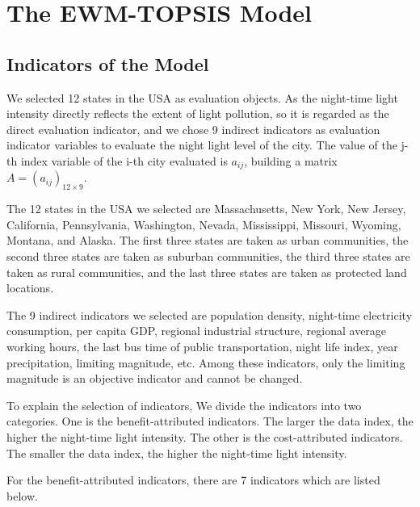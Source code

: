 \section{The EWM-TOPSIS Model}

\subsection{Indicators of the Model}
We selected 12 states in the USA as evaluation objects. As the night-time light intensity directly reflects the extent of light pollution, so it is regarded as the direct evaluation indicator, and we chose 9 indirect indicators as evaluation indicator variables to evaluate the night light level of the city. 
The value of the j-th index variable of the i-th city evaluated is $a_{ij}$, building a matrix $A=(a_{ij})_{12\times9}$.

The 12 states in the USA we selected are Massachusetts, New York, New Jersey, California, Pennsylvania, Washington, Nevada, Mississippi, Missouri, Wyoming, Montana, and Alaska. The first three states are taken as urban communities, the second three states are taken as suburban communities, the third three states are taken as rural communities, and the last three states are taken as protected land locations.

The 9 indirect indicators we selected are population density, night-time electricity consumption, per capita GDP, regional industrial structure, regional average working hours, the last bus time of public transportation, night life index, year precipitation, limiting magnitude, etc. Among these indicators, only the limiting magnitude is an objective indicator and cannot be changed.

To explain the selection of indicators, We divide the indicators into two categories. One is the benefit-attributed indicators. The larger the data index, the higher the night-time light intensity. The other is the cost-attributed indicators. The smaller the data index, the higher the night-time light intensity.

For the benefit-attributed indicators, there are 7 indicators which are listed below.

